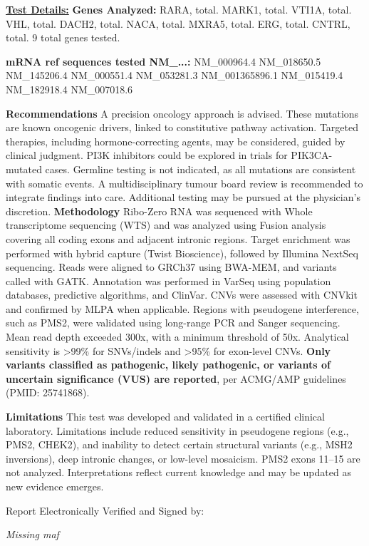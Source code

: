 \documentclass[11pt]{extarticle}
\begin{document}
{\huge \bf \underline{Test Details:}} \newline
\newline
{\bf \Large Genes Analyzed: } RARA, total. MARK1, total. VTI1A, total. VHL, total. DACH2, total. NACA, total. MXRA5, total. ERG, total. CNTRL, total.  
9 total genes tested. 

{\bf \large mRNA ref sequences tested NM_...:}
NM\_000964.4 NM\_018650.5 NM\_145206.4 NM\_000551.4 NM\_053281.3 NM\_001365896.1 NM\_015419.4 NM\_182918.4 NM\_007018.6 

\newline \newline
{\Large \bf Recommendations \newline}
A precision oncology approach is advised. These mutations are known oncogenic drivers, linked to constitutive pathway activation. Targeted therapies, including hormone-correcting agents, may be considered, guided by clinical judgment. PI3K inhibitors could be explored in trials for PIK3CA-mutated cases. Germline testing is not indicated, as all mutations are consistent with somatic events. A multidisciplinary tumour board review is recommended to integrate findings into care. Additional testing may be pursued at the physician’s discretion. 
\newline 
\newline
{\Large \bf Methodology \newline}
Ribo-Zero RNA was sequenced with Whole transcriptome sequencing (WTS) and was analyzed using Fusion analysis covering all coding exons and adjacent intronic regions. Target enrichment was performed with hybrid capture (Twist Bioscience), followed by Illumina NextSeq sequencing. Reads were aligned to GRCh37 using BWA-MEM, and variants called with GATK. Annotation was performed in VarSeq using population databases, predictive algorithms, and ClinVar. CNVs were assessed with CNVkit and confirmed by MLPA when applicable. Regions with pseudogene interference, such as PMS2, were validated using long-range PCR and Sanger sequencing. Mean read depth exceeded 300x, with a minimum threshold of 50x. Analytical sensitivity is >99\% for SNVs/indels and >95\% for exon-level CNVs. {\bf Only variants classified as pathogenic, likely pathogenic, or variants of uncertain significance (VUS) are reported}, per ACMG/AMP guidelines (PMID: 25741868).

{\Large \bf Limitations \newline}
This test was developed and validated in a certified clinical laboratory. Limitations include reduced sensitivity in pseudogene regions (e.g., PMS2, CHEK2), and inability to detect certain structural variants (e.g., MSH2 inversions), deep intronic changes, or low-level mosaicism. PMS2 exons 11–15 are not analyzed. Interpretations reflect current knowledge and may be updated as new evidence emerges.

\newpage
{\huge Report Electronically Verified and Signed by: }

\it{Missing} maf
\end{document}
